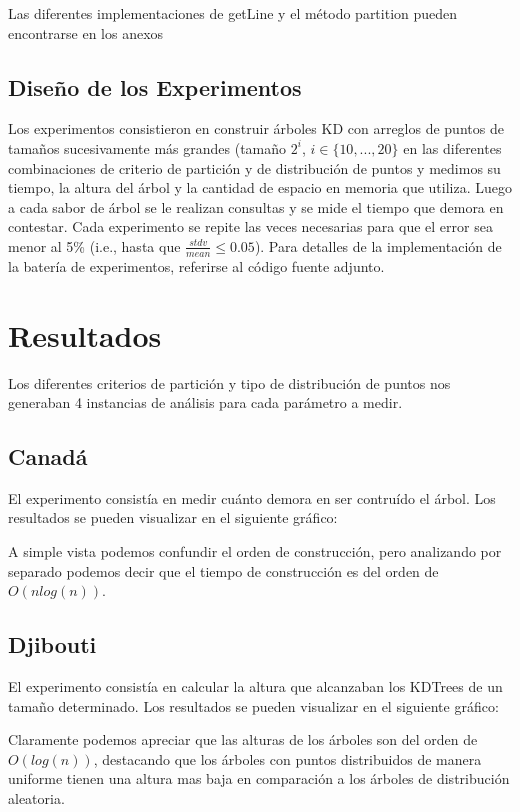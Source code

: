 \documentclass[12pt,letterpaper, margin = 3cm]{article}
\begin{document}
Las diferentes implementaciones de getLine y el método partition pueden encontrarse en los anexos


\subsection{Diseño de los Experimentos}
Los experimentos consistieron en construir árboles KD con arreglos de puntos de tamaños sucesivamente más grandes (tamaño $2^i$, $i\in\{10,...,20\}$ en las diferentes combinaciones de criterio de partición y de distribución de puntos y medimos su tiempo, la altura del árbol y la cantidad de espacio en memoria que utiliza. Luego a cada sabor de árbol se le realizan consultas y se mide el tiempo que demora en contestar. Cada experimento se repite las veces necesarias para que el error sea menor al 5\% (i.e., hasta que $\frac{stdv}{mean}\leq 0.05$). Para detalles de la implementación de la batería de experimentos, referirse al código fuente adjunto.

\newpage
\section{Resultados}
Los diferentes criterios de partición y tipo de distribución de puntos nos generaban 4 instancias de análisis para cada parámetro a medir.

\subsection{Canadá}
El experimento consistía en medir cuánto demora en ser contruído el árbol. Los resultados se pueden visualizar en el siguiente gráfico:

A simple vista podemos confundir el orden de construcción, pero analizando por separado podemos decir que el tiempo de construcción es del orden de $O(n log(n))$.


\newpage
\subsection{Djibouti}
El experimento consistía en calcular la altura que alcanzaban los KDTrees de un tamaño determinado. Los resultados se pueden visualizar en el siguiente gráfico:

Claramente podemos apreciar que las alturas de los árboles son del orden de $O(log(n))$, destacando que los árboles con puntos distribuidos de manera uniforme tienen una altura mas baja en comparación a los árboles de distribución aleatoria.
\newpage
\end{document}
